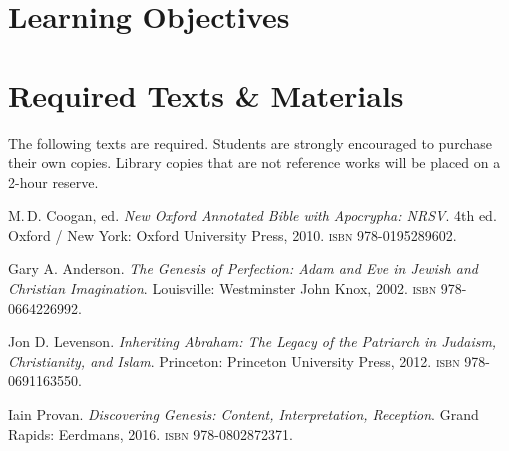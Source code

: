 \documentclass[titlepage]{article}
\newcommand\incl{../includes}
\begin{document}


\section{Learning Objectives}
\label{objectives}
\edobject

\section{Required Texts \& Materials}
\label{texts}

The following texts are required. Students are strongly encouraged to
purchase their own copies. Library copies that are not reference works
will be placed on a 2-hour reserve.

\begingroup
\renewcommand{\section}[2]{}%
\begin{thebibliography}{Anderson}%

	 M.\,D. Coogan, ed.
    \emph{New Oxford Annotated Bible with Apocrypha: NRSV}. 4th ed.
    Oxford / New York: Oxford University Press, 2010.
    \textsc{isbn} 978-0195289602.


	 Gary A. Anderson.
	\emph{The Genesis of Perfection: Adam and Eve in Jewish and Christian Imagination}.
	Louisville: Westminster John Knox, 2002.
	\textsc{isbn} 978-0664226992.

	 Jon D. Levenson.
	\emph{Inheriting Abraham: The Legacy of the Patriarch in Judaism, Christianity, and Islam}.
	Princeton: Princeton University Press, 2012.
	\textsc{isbn} 978-0691163550.

	 Iain Provan.
	\emph{Discovering Genesis: Content, Interpretation, Reception}.
	Grand Rapids: Eerdmans, 2016.
	\textsc{isbn} 978-0802872371.


\end{thebibliography}
\endgroup
\end{document}
